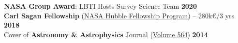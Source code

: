 \documentclass[11pt]{article}
\begin{document}
\vspace{-0.2cm}
\textbf{NASA Group Award}: LBTI Hosts Survey Science Team \hfill   \textbf{2020}\\ 

\vspace{-0.2cm}
\textbf{Carl Sagan Fellowship} (\href{http://www.stsci.edu/stsci-research/fellowships/nasa-hubble-fellowship-program}{NASA Hubble Fellowship Program}) -- 280k€/3 yrs \hfill   \textbf{2018}\\

\vspace{-0.2cm}
Cover of \textbf{Astronomy \& Astrophysics} Journal (\href{https://www.aanda.org/articles/aa/abs/2014/04/contents/contents.html}{Volume 564}) \hfill  \textbf{2014}\\





\end{document}
